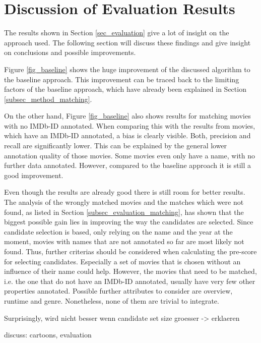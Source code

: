 \section{Discussion of Evaluation Results}
\label{sec_discussion}

The results shown in Section \ref{sec_evaluation} give a lot of insight on the approach used.
The following section will discuss these findings and give insight on conclusions and possible improvements.

Figure \ref{fig_baseline} shows the huge improvement of the discussed algorithm to the baseline approach.
This improvement can be traced back to the limiting factors of the baseline approach, which have already been explained in Section \ref{subsec_method_matching}.

On the other hand, Figure \ref{fig_baseline} also shows results for matching movies with no IMDb-ID annotated.
When comparing this with the results from movies, which have an IMDb-ID annotated, a bias is clearly visible.
Both, precision and recall are significantly lower.
This can be explained by the general lower annotation quality of those movies.
Some movies even only have a name, with no further data annotated.
However, compared to the baseline approach it is still a good improvement.

Even though the results are already good there is still room for better results.
The analysis of the wrongly matched movies and the matches which were not found, as listed in Section \ref{subsec_evaluation_matching}, has shown that the biggest possible gain lies in improving the way the candidates are selected.
Since candidate selection is based, only relying on the name and the year at the moment, movies with names that are not annotated so far are most likely not found.
Thus, further criterias should be considered when calculating the pre-score for selecting candidates.
Especially a set of movies that is chosen without an influence of their name could help.
However, the movies that need to be matched, i.e. the one that do not have an IMDb-ID annotated, usually have very few other properties annotated.
Possible further attributes to consider are overview, runtime and genre.
Nonetheless, none of them are trivial to integrate.

Surprisingly, wird nicht besser wenn candidate set size groesser -> erklaeren

discuss: cartoons, evaluation

